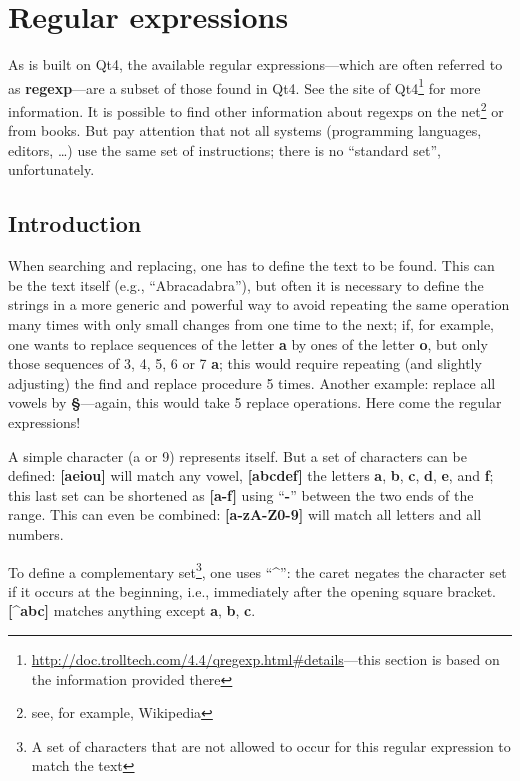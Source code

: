 
\chapter{Regular expressions}
\label{sec:regexp}

As {\Tw} is built on Qt4, the available regular expressions---which are often referred to as \textbf{regexp}---are a subset of those found in Qt4. See the site of Qt4\footnote{\label{fn.regexpQt}\url{http://doc.trolltech.com/4.4/qregexp.html#details}---this section is based on the information provided there} for more information. It is possible to find other information about regexps on the net\footnote{see, for example, Wikipedia} or from books. But pay attention that not all systems (programming languages, editors, \dots) use the same set of instructions; there is no ``standard set'', unfortunately.

\section{Introduction}

When searching and replacing, one has to define the text to be found. This can be the text itself (e.g., ``Abracadabra''), but often it is necessary to define the strings in a more generic and powerful way to avoid repeating the same operation many times with only small changes from one time to the next; if, for example, one wants to replace sequences of the letter \textbf{a} by ones of the letter \textbf{o}, but only those sequences of 3, 4, 5, 6 or 7 \textbf{a}; this would require repeating (and slightly adjusting) the find and replace procedure 5 times. Another example: replace all vowels by \textbf{§}---again, this would take 5 replace operations. Here come the regular expressions!

A simple character (a or 9) represents itself. But a set of characters can be defined: \textbf{[aeiou]} will match any vowel, \textbf{[abcdef]} the letters \textbf{a}, \textbf{b}, \textbf{c}, \textbf{d}, \textbf{e}, and \textbf{f}; this last set can be shortened as \textbf{[a-f]} using ``\textbf{-}'' between the two ends of the range. This can even be combined: \textbf{[a-zA-Z0-9]} will match all letters and all numbers.

To define a complementary set\footnote{A set of characters that are not allowed to occur for this regular expression to match the text}, one uses ``\textbf{\^{}}'': the caret negates the character set if it occurs at the beginning, i.e., immediately after the opening square bracket. \textbf{[\^{}abc]} matches anything except \textbf{a}, \textbf{b}, \textbf{c}.


